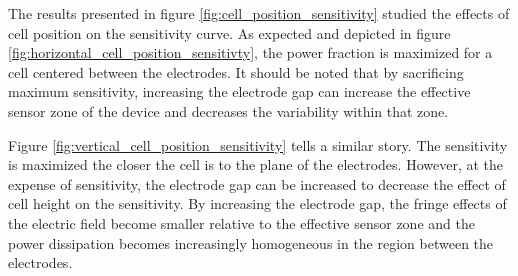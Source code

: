 \par The results presented in figure \ref{fig:cell_position_sensitivity} studied the effects of cell position on the sensitivity curve. As expected and depicted in figure \ref{fig:horizontal_cell_position_sensitivty}, the power fraction is maximized for a cell centered between  the electrodes. It should be noted that by sacrificing maximum sensitivity, increasing the electrode gap can increase the effective sensor zone of the device and decreases the variability within that zone.

\par Figure \ref{fig:vertical_cell_position_sensitivity} tells a similar story. The sensitivity is maximized the closer the cell is to the plane of the electrodes. However, at the expense of sensitivity, the electrode gap can be increased to decrease the effect of cell height on the sensitivity. By increasing the electrode gap, the fringe effects of the electric field become smaller relative to the effective sensor zone and the power dissipation becomes increasingly homogeneous in the region between the electrodes. 